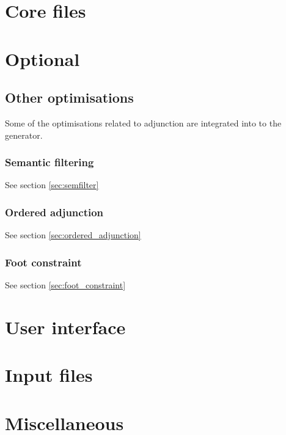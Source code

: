 \documentclass[a4paper,11pt]{report}
\begin{document}



\part{Core files}

       
       
       
       
       

\part{Optional}

       
       
% 

\chapter{Other optimisations}
\label{chp:other_optimisations}

Some of the optimisations related to adjunction are integrated into
to the generator.

\section{Semantic filtering}

See section \ref{sec:semfilter}

\section{Ordered adjunction}

See section \ref{sec:ordered_adjunction}

\section{Foot constraint}

See section \ref{sec:foot_constraint}

\part{User interface}






\part{Input files}




%
%

\part{Miscellaneous}




{


}
\end{document}
